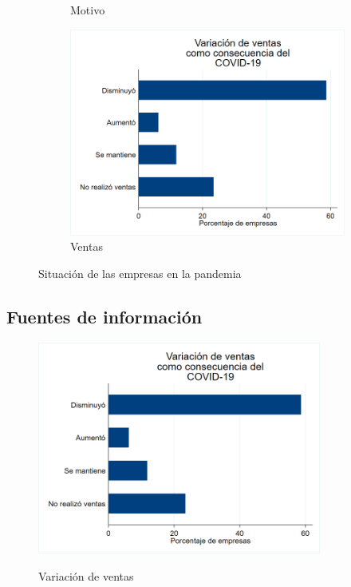 \documentclass[12pt,a4paper]{article} %
\begin{document}
\begin{figure}[ht]
\begin{subfigure}[b]{0.3\textwidth}
          \caption{Motivo}
          \label{fig: Motivo}
        \end{subfigure}
        \hfill
        \begin{subfigure}[b]{0.3\textwidth}
        	\centering
          \includegraphics[width=\textwidth]{EXAMEN_FINAL/Imagenes/Graph3.png}
          \caption{Ventas}
          \label{fig: Ventas}
        \end{subfigure}
        	\caption{Situación de las empresas en la pandemia}
        	\label{fig: Situación de las empresas en la pandemia}
    \end{figure}

    \subsection{Fuentes de información}
			\lipsum[1]
			\begin{figure}[h]
				\centering
				\caption{Variación de ventas}
				\includegraphics[height=7cm]{EXAMEN_FINAL/Imagenes/Graph3.png}
				\label{fig: Variación de ventas}
			\end{figure}
\end{document}
